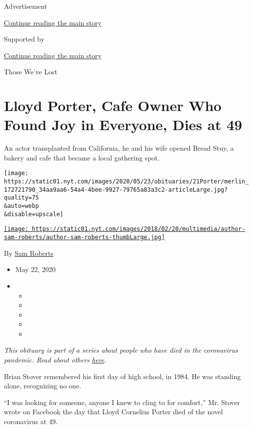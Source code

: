 Advertisement

\protect\hyperlink{after-top}{Continue reading the main story}

Supported by

\protect\hyperlink{after-sponsor}{Continue reading the main story}

Those We've Lost

\hypertarget{lloyd-porter-cafe-owner-who-found-joy-in-everyone-dies-at-49}{%
\section{Lloyd Porter, Cafe Owner Who Found Joy in Everyone, Dies at
49}\label{lloyd-porter-cafe-owner-who-found-joy-in-everyone-dies-at-49}}

An actor transplanted from California, he and his wife opened Bread
Stuy, a bakery and cafe that became a local gathering spot.

\texttt{[image: https://static01.nyt.com/images/2020/05/23/obituaries/21Porter/merlin\_172721790\_34aa9aa6-54a4-4bee-9927-79765a83a3c2-articleLarge.jpg?quality=75\\\&auto=webp\\\&disable=upscale]}

\href{https://www.nytimes.com/by/sam-roberts}{\texttt{[image: https://static01.nyt.com/images/2018/02/20/multimedia/author-sam-roberts/author-sam-roberts-thumbLarge.jpg]}}

By \href{https://www.nytimes.com/by/sam-roberts}{Sam Roberts}

\begin{itemize}
\item
  May 22, 2020
\item
  \begin{itemize}
  \item
  \item
  \item
  \item
  \item
  \end{itemize}
\end{itemize}

\emph{This obituary is part of a series about people who have died in
the coronavirus pandemic. Read about others}
\href{https://www.nytimes.com/series/people-who-have-died-of-the-coronavirus}{\emph{here}}\emph{.}

Brian Stover remembered his first day of high school, in 1984. He was
standing alone, recognizing no one.

``I was looking for someone, anyone I knew to cling to for comfort,''
Mr. Stover wrote on Facebook the day that Lloyd Cornelius Porter died of
the novel coronavirus at 49.


